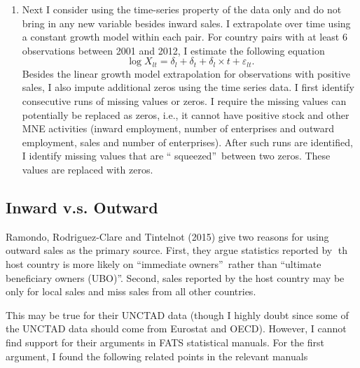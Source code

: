 \documentclass[notitlepage,11pt]{article}%
\begin{document}
\begin{enumerate}
\item Next I consider using the time-series property of the data only and do
not bring in any new variable besides inward sales. I extrapolate over time
using a constant growth model within each pair. For country pairs with at
least 6 observations between 2001 and 2012, I estimate the following equation%
\[
\log X_{lt}=\delta_{l}+\delta_{t}+\delta_{l}\times t+\varepsilon_{lt}.
\]
Besides the linear growth model extrapolation for observations with positive
sales, I also impute additional zeros using the time series data. I first
identify consecutive runs of missing values or zeros. I require the missing
values can potentially be replaced as zeros, i.e., it cannot have positive
stock and other MNE activities (inward employment, number of enterprises and
outward employment, sales and number of enterprises). \qquad After such runs
are identified, I identify missing values that are \textquotedblleft
squeezed\textquotedblright\ between two zeros. These values are replaced with zeros.
\end{enumerate}

\subsection{Inward v.s. Outward}

Ramondo, Rodriguez-Clare and Tintelnot (2015) give two reasons for using
outward sales as the primary source. First, they argue statistics reported by
th host country is more likely on \textquotedblleft immediate
owners\textquotedblright\ rather than \textquotedblleft ultimate beneficiary
owners (UBO)\textquotedblright. Second, sales reported by the host country may
be only for local sales and miss sales from all other countries. 

This may be true for their UNCTAD data (though I highly doubt since some of
the UNCTAD data should come from Eurostat and OECD). However, I cannot find
support for their arguments in FATS statistical manuals. For the first
argument, I found the following related points in the relevant manuals
\end{document}
